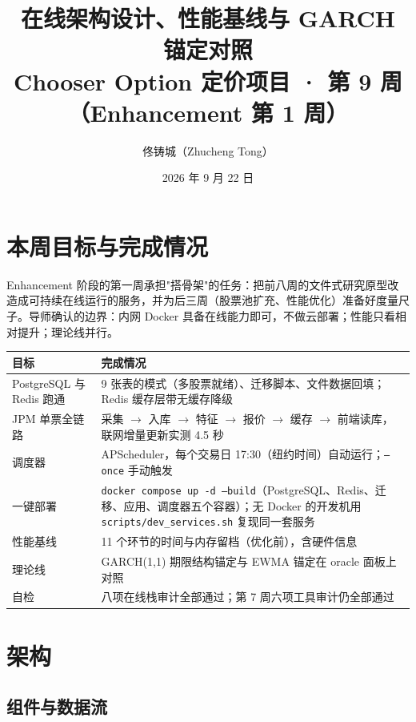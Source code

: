 \documentclass[11pt]{ctexart}
\title{\textbf{在线架构设计、性能基线与 GARCH 锚定对照}\\
\large Chooser Option 定价项目 · 第 9 周（Enhancement 第 1 周）}
\author{佟铸城（Zhucheng Tong）}
\date{2026 年 9 月 22 日}
\begin{document}
\maketitle

\section{本周目标与完成情况}

Enhancement 阶段的第一周承担"搭骨架"的任务：把前八周的文件式研究原型改造成可持续在线运行的服务，并为后三周（股票池扩充、性能优化）准备好度量尺子。导师确认的边界：内网 Docker 具备在线能力即可，不做云部署；性能只看相对提升；理论线并行。

\begin{center}\small
\begin{tabular}{p{4.0cm}p{11.0cm}}
\toprule
目标 & 完成情况 \\
\midrule
PostgreSQL 与 Redis 跑通 & 9 张表的模式（多股票就绪）、迁移脚本、文件数据回填；Redis 缓存层带无缓存降级 \\
JPM 单票全链路 & 采集 $\to$ 入库 $\to$ 特征 $\to$ 报价 $\to$ 缓存 $\to$ 前端读库，联网增量更新实测 4.5 秒 \\
调度器 & APScheduler，每个交易日 17:30（纽约时间）自动运行；\texttt{--once} 手动触发 \\
一键部署 & \texttt{docker compose up -d --build}（PostgreSQL、Redis、迁移、应用、调度器五个容器）；无 Docker 的开发机用 \texttt{scripts/dev\_services.sh} 复现同一套服务 \\
性能基线 & 11 个环节的时间与内存留档（优化前），含硬件信息 \\
理论线 & GARCH(1,1) 期限结构锚定与 EWMA 锚定在 oracle 面板上对照 \\
自检 & 八项在线栈审计全部通过；第 7 周六项工具审计仍全部通过 \\
\bottomrule
\end{tabular}
\end{center}

\section{架构}

\subsection{组件与数据流}
\end{document}
